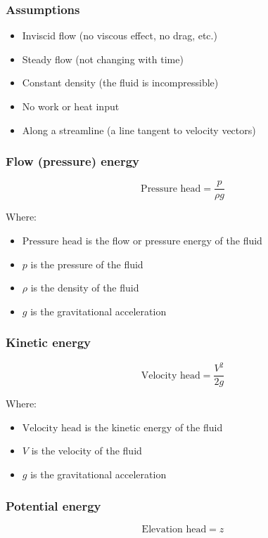 \documentclass[11pt]{article}
\begin{document}
\subsubsection{Assumptions}
\label{sec:org31eb54f}
\begin{itemize}
\item Inviscid flow (no viscous effect, no drag, etc.)
\item Steady flow (not changing with time)
\item Constant density (the fluid is incompressible)
\item No work or heat input
\item Along a streamline (a line tangent to velocity vectors)
\end{itemize}

\subsubsection{Flow (pressure) energy}
\label{sec:orgcc073f0}
\[\text{Pressure head} = \frac{p}{\rho g}\]

Where:
\begin{itemize}
\item \(\text{Pressure head}\) is the flow or pressure energy of the fluid
\item \(p\) is the pressure of the fluid
\item \(\rho\) is the density of the fluid
\item \(g\) is the gravitational acceleration
\end{itemize}

\subsubsection{Kinetic energy}
\label{sec:orgfa5173d}
\[\text{Velocity head} = \frac{V^2}{2g}\]

Where:
\begin{itemize}
\item \(\text{Velocity head}\) is the kinetic energy of the fluid
\item \(V\) is the velocity of the fluid
\item \(g\) is the gravitational acceleration
\end{itemize}

\subsubsection{Potential energy}
\label{sec:org90cfe0d}
\[\text{Elevation head} = z\]
\end{document}
